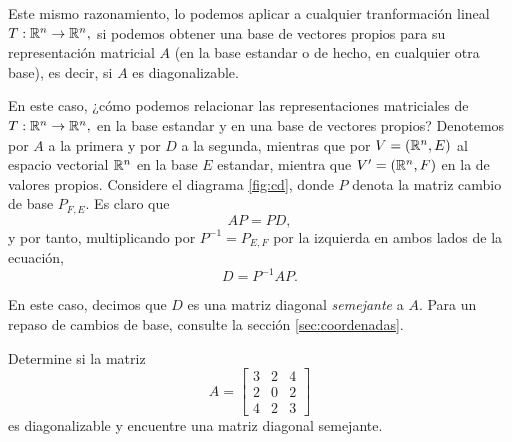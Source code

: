 Este mismo razonamiento, lo podemos aplicar a cualquier tranformación lineal $T:\mathbb{R}^{n} \to \mathbb{R}^{n},$ si podemos obtener
una base de vectores propios para su representación matricial $A$ (en la base estandar o de hecho, en cualquier otra
base), es decir, si $A$ es diagonalizable.



En este caso, ¿cómo podemos relacionar las representaciones matriciales de $T:\mathbb{R}^{n} \to \mathbb{R}^{n},$ en la base estandar y
en una base de vectores propios? Denotemos por $A$ a la primera y por $D$ a la segunda, mientras que por
$V=(\mathbb{R}^{n},E)$ al espacio vectorial $\mathbb{R}^{n}$ en la base $E$ estandar, mientra que $V'=(\mathbb{R}^{n}, F)$ en la de valores
propios. Considere el diagrama \ref{fig:cd}, donde $P$ denota la matriz cambio de base $P_{F,E}$. Es claro que
$$
AP=PD,
$$
y por tanto, multiplicando por $P^{-1}=P_{E,F}$ por la izquierda en ambos lados de la ecuación, $$D=P^{-1}AP.$$

En este caso, decimos que $D$ es una matriz diagonal \emph{semejante} a $A.$
Para un repaso de cambios de base, consulte la sección \ref{sec:coordenadas}.


\begin{resuelto}
 Determine si la matriz $$A=
\begin{bmatrix}
 3 & 2 & 4 \\
 2 & 0 & 2 \\
 4 & 2 & 3
\end{bmatrix}
 $$
 es diagonalizable y encuentre una matriz diagonal semejante.
\end{resuelto}

